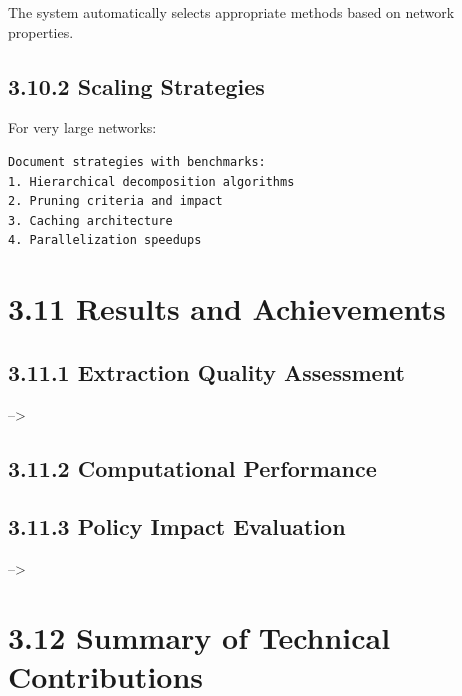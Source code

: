 \documentclass[
  11pt,
  letterpaper,
]{book}
\begin{document}
The system automatically selects appropriate methods based on network
properties.

\subsection*{3.10.2 Scaling Strategies}\label{sec-scaling-strategies}

For very large networks:

\begin{verbatim}
Document strategies with benchmarks:
1. Hierarchical decomposition algorithms
2. Pruning criteria and impact
3. Caching architecture
4. Parallelization speedups
\end{verbatim}

\section*{3.11 Results and Achievements}\label{sec-results-achievements}


\subsection*{3.11.1 Extraction Quality
Assessment}\label{sec-extraction-quality}

--\textgreater{}

\subsection*{3.11.2 Computational
Performance}\label{sec-computational-performance}

\subsection*{3.11.3 Policy Impact Evaluation}\label{sec-policy-impact}

--\textgreater{}

\section*{3.12 Summary of Technical
Contributions}\label{sec-technical-summary}
\end{document}

